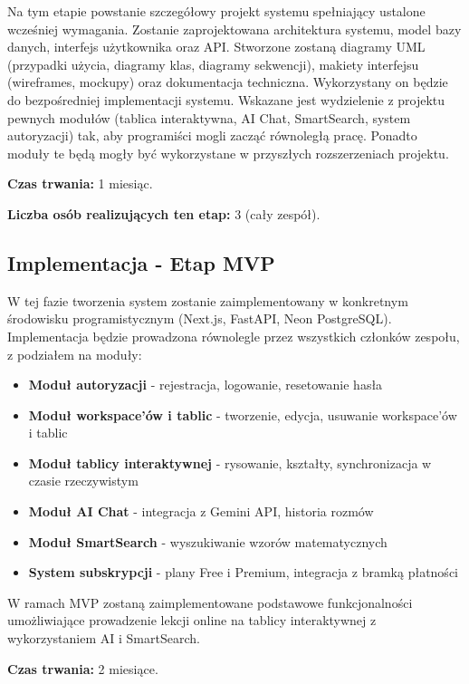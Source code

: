 \documentclass[12pt,a4paper]{article}
\begin{document}
Na tym etapie powstanie szczegółowy projekt systemu spełniający ustalone wcześniej wymagania. Zostanie zaprojektowana architektura systemu, model bazy danych, interfejs użytkownika oraz API. Stworzone zostaną diagramy UML (przypadki użycia, diagramy klas, diagramy sekwencji), makiety interfejsu (wireframes, mockupy) oraz dokumentacja techniczna. Wykorzystany on będzie do bezpośredniej implementacji systemu. Wskazane jest wydzielenie z projektu pewnych modułów (tablica interaktywna, AI Chat, SmartSearch, system autoryzacji) tak, aby programiści mogli zacząć równoległą pracę. Ponadto moduły te będą mogły być wykorzystane w przyszłych rozszerzeniach projektu.

\textbf{Czas trwania:} 1 miesiąc.

\textbf{Liczba osób realizujących ten etap:} 3 (cały zespół).

\subsection{Implementacja - Etap MVP}

W tej fazie tworzenia system zostanie zaimplementowany w konkretnym środowisku programistycznym (Next.js, FastAPI, Neon PostgreSQL). Implementacja będzie prowadzona równolegle przez wszystkich członków zespołu, z podziałem na moduły:

\begin{itemize}[leftmargin=*]
    \item \textbf{Moduł autoryzacji} - rejestracja, logowanie, resetowanie hasła
    \item \textbf{Moduł workspace'ów i tablic} - tworzenie, edycja, usuwanie workspace'ów i tablic
    \item \textbf{Moduł tablicy interaktywnej} - rysowanie, kształty, synchronizacja w czasie rzeczywistym
    \item \textbf{Moduł AI Chat} - integracja z Gemini API, historia rozmów
    \item \textbf{Moduł SmartSearch} - wyszukiwanie wzorów matematycznych
    \item \textbf{System subskrypcji} - plany Free i Premium, integracja z bramką płatności
\end{itemize}

W ramach MVP zostaną zaimplementowane podstawowe funkcjonalności umożliwiające prowadzenie lekcji online na tablicy interaktywnej z wykorzystaniem AI i SmartSearch.

\textbf{Czas trwania:} 2 miesiące.
\end{document}
